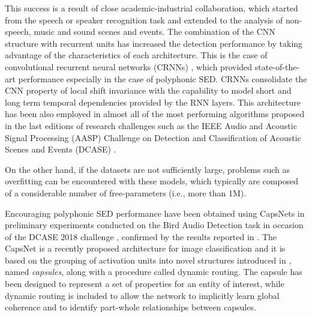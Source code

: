This success is a result of close academic-industrial collaboration, which started from the speech or speaker recognition task and extended to the analysis of non-speech, music and sound scenes and events. The combination of the CNN structure with recurrent units has increased the detection performance by taking advantage of the characteristics of each architecture. This is the case of convolutional recurrent neural networks (CRNNs) \cite{cakir2017convolutional}, which provided state-of-the-art performance especially in the case of polyphonic SED. CRNNs consolidate the CNN property of local shift invariance with the capability to model short and long term temporal dependencies provided by the RNN layers. This architecture has been also employed in almost all of the most performing algorithms proposed in the last editions of research challenges such as the IEEE Audio and Acoustic Signal Processing (AASP) Challenge on  Detection and Classification of Acoustic Scenes and Events (DCASE) \cite{DCASE2017Workshop}. 

On the other hand, if the datasets are not sufficiently large, problems such as overfitting can be encountered with these models, which typically are composed of a considerable number of free-parameters (i.e., more than 1M). 

Encouraging polyphonic SED performance have been obtained using CapsNets in preliminary experiments conducted on the Bird Audio Detection task in occasion of the DCASE 2018 challenge \cite{vesperini2018capsule}, confirmed by the results reported in \cite{iqbal2018capsule}.
The CapsNet \cite{sabour2017dynamic} is a recently proposed architecture for image classification and it is based on the grouping of activation units into novel structures introduced in \cite{hinton2011transforming}, named \textit{capsules}, along with a procedure called dynamic routing. The capsule has been designed to represent a set of properties for an entity of interest, while dynamic routing is included to allow the network to implicitly learn global coherence and to identify part-whole relationships between capsules.


